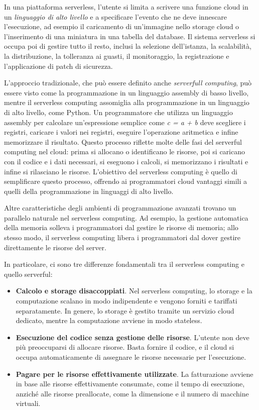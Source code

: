 In una piattaforma serverless, l'utente si limita a scrivere una funzione cloud in un \textit{linguaggio di alto livello} e a specificare l'evento che ne deve innescare l'esecuzione, ad esempio il caricamento di un'immagine nello storage cloud o l'inserimento di una miniatura in una tabella del database. Il sistema serverless si occupa poi di gestire tutto il resto, inclusi la selezione dell'istanza, la scalabilità, la distribuzione, la tolleranza ai guasti, il monitoraggio, la registrazione e l'applicazione di patch di sicurezza. 

L'approccio tradizionale, che può essere definito anche \textit{serverfull computing}, può essere visto come la programmazione in un linguaggio assembly di basso livello, mentre il serverless computing assomiglia alla programmazione in un linguaggio di alto livello, come Python. Un programmatore che utilizza un linguaggio assembly per calcolare un'espressione semplice come \textit{c = a + b} deve scegliere i registri, caricare i valori nei registri, eseguire l'operazione aritmetica e infine memorizzare il risultato. Questo processo riflette molte delle fasi del serverful computing nel cloud: prima si allocano o identificano le risorse, poi si caricano con il codice e i dati necessari, si eseguono i calcoli, si memorizzano i risultati e infine si rilasciano le risorse. L'obiettivo del serverless computing è quello di semplificare questo processo, offrendo ai programmatori cloud vantaggi simili a quelli della programmazione in linguaggi di alto livello.

Altre caratteristiche degli ambienti di programmazione avanzati trovano un parallelo naturale nel serverless computing. Ad esempio, la gestione automatica della memoria solleva i programmatori dal gestire le risorse di memoria; allo stesso modo, il serverless computing libera i programmatori dal dover gestire direttamente le risorse del server.

In particolare, ci sono tre differenze fondamentali tra il serverless computing e quello serverful:
\begin{itemize}
    \item \textbf{Calcolo e storage disaccoppiati}. Nel serverless computing, lo storage e la computazione scalano in modo indipendente e vengono forniti e tariffati separatamente. In genere, lo storage è gestito tramite un servizio cloud dedicato, mentre la computazione avviene in modo stateless.
    \item \textbf{Esecuzione del codice senza gestione delle risorse}. L'utente non deve più preoccuparsi di allocare risorse. Basta fornire il codice, e il cloud si occupa automaticamente di assegnare le risorse necessarie per l'esecuzione.
    \item \textbf{Pagare per le risorse effettivamente utilizzate}. La fatturazione avviene in base alle risorse effettivamente consumate, come il tempo di esecuzione, anziché alle risorse preallocate, come la dimensione e il numero di macchine virtuali.
\end{itemize}

